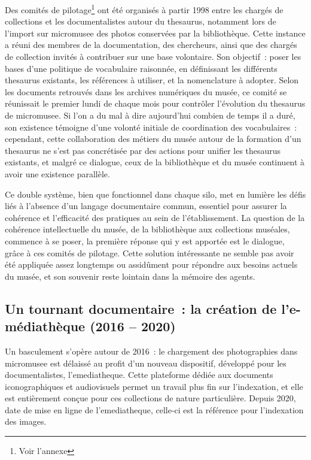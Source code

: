 Des comités de pilotage\footnote{Voir l'annexe } ont été organisés à partir 1998 entre les chargés de collections et les documentalistes autour du \gls{thesaurus}, notamment lors de l'import sur \gls{micromusee} des photos conservées par la bibliothèque. Cette instance a réuni des membres de la documentation, des chercheurs, ainsi que des chargés de collection invités à contribuer sur une base volontaire. Son objectif~: poser les bases d'une politique de vocabulaire raisonnée, en définissant les différents \gls{thesaurus} existants, les références à utiliser, et la nomenclature à adopter. Selon les documents retrouvés dans les archives numériques du musée, ce comité se réunissait le premier lundi de chaque mois pour contrôler l'évolution du \gls{thesaurus} de \gls{micromusee}. Si l'on a du mal à dire aujourd'hui combien de temps il a duré, son existence témoigne d'une volonté initiale de coordination des vocabulaires~: cependant, cette collaboration des métiers du musée autour de la formation d'un \gls{thesaurus} ne s'est pas concrétisée par des actions pour unifier les \gls{thesaurus} existants, et malgré ce dialogue, ceux de la bibliothèque et du musée continuent à avoir une existence parallèle.

Ce double système, bien que fonctionnel dans chaque silo, met en lumière les défis liés à l'absence d'un langage documentaire commun, essentiel pour assurer la cohérence et l'efficacité des pratiques au sein de l'établissement. La question de la cohérence intellectuelle du musée, de la bibliothèque aux collections muséales, commence à se poser, la première réponse qui y est apportée est le dialogue, grâce à ces comités de pilotage. Cette solution intéressante ne semble pas avoir été appliquée assez longtemps ou assidûment pour répondre aux besoins actuels du musée, et son souvenir reste lointain dans la mémoire des agents.

\subsection{Un tournant documentaire~: la création de l'e-médiathèque (2016 – 2020)}

Un basculement s'opère autour de 2016~: le chargement des photographies dans \gls{micromusee} est délaissé au profit d'un nouveau dispositif, développé pour les documentalistes, l'\gls{emediatheque}. Cette plateforme dédiée aux documents iconographiques et audiovisuels permet un travail plus fin sur l'indexation, et elle est entièrement conçue pour ces collections de nature particulière. Depuis 2020, date de mise en ligne de l'\gls{emediatheque}, celle-ci est la référence pour l'indexation des images.

